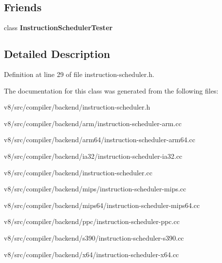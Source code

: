 \subsection*{Friends}
\begin{DoxyCompactItemize}
\item 
\mbox{\label{classv8_1_1internal_1_1compiler_1_1InstructionScheduler_a0cfb29ca2399ac98b222a549d9aaf9f6}} 
class {\bfseries Instruction\+Scheduler\+Tester}
\end{DoxyCompactItemize}


\subsection{Detailed Description}


Definition at line 29 of file instruction-\/scheduler.\+h.



The documentation for this class was generated from the following files\+:\begin{DoxyCompactItemize}
\item 
v8/src/compiler/backend/instruction-\/scheduler.\+h\item 
v8/src/compiler/backend/arm/instruction-\/scheduler-\/arm.\+cc\item 
v8/src/compiler/backend/arm64/instruction-\/scheduler-\/arm64.\+cc\item 
v8/src/compiler/backend/ia32/instruction-\/scheduler-\/ia32.\+cc\item 
v8/src/compiler/backend/instruction-\/scheduler.\+cc\item 
v8/src/compiler/backend/mips/instruction-\/scheduler-\/mips.\+cc\item 
v8/src/compiler/backend/mips64/instruction-\/scheduler-\/mips64.\+cc\item 
v8/src/compiler/backend/ppc/instruction-\/scheduler-\/ppc.\+cc\item 
v8/src/compiler/backend/s390/instruction-\/scheduler-\/s390.\+cc\item 
v8/src/compiler/backend/x64/instruction-\/scheduler-\/x64.\+cc\end{DoxyCompactItemize}
